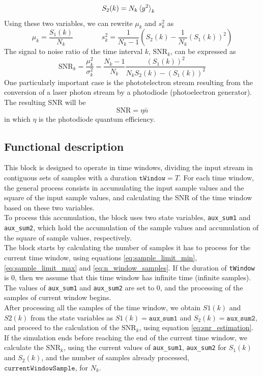 \begin{refsection}
\begin{align}
	S_2(k) &= N_k \braket{y^2}_k
\end{align}
Using these two variables, we can rewrite $\mu_k$ and $s^2_k$ as
\begin{equation}
	\mu_k = \frac{S_1(k)}{N_k}
	\qquad \qquad
	s_k^2 = \frac{1}{N_k-1} \left( S_2(k) - \frac{1}{N_k}(S_1(k))^2 \right)
\end{equation}
The signal to noise ratio of the time interval $k$, $\textrm{SNR}_k$, can be expressed as
\begin{equation}
	\textrm{SNR}_k = \frac{\mu_k^2}{\sigma_k^2} =  \frac{N_k - 1}{N_k}\frac{(S_1(k))^2}{N_k S_2(k) - (S_1(k))^2}
	\label{eq:snr_estimation}
\end{equation}
%
One particularly important case is the phototelectron stream resulting from the conversion of a laser photon stream by a photodiode (photoelectron generator). The resulting SNR will be
\cite{saleh1991}
%
\begin{equation}
	\textrm{SNR} = \eta \bar{n}
	\label{eq:ideal_poisson_snr}
\end{equation}
in which $\eta$ is the photodiode quantum efficiency.
%
\subsection*{Functional description}
%
This block is designed to operate in time windows, dividing the input stream in contiguous sets of samples with a duration $\texttt{tWindow} = T$.
For each time window, the general process consists in accumulating the input sample values and the square of the input sample values, and calculating the SNR of the time window based on these two variables.\\
To process this accumulation, the block uses two state variables, \texttt{aux\_sum1} and \texttt{aux\_sum2}, which hold the accumulation of the sample values and accumulation of the square of sample values, respectively.\\
The block starts by calculating the number of samples it has to process for the current time window, using equations \ref{eq:sample_limit_min}, \ref{eq:sample_limit_max} and \ref{eq:n_window_samples}.
If the duration of \texttt{tWindow} is $0$, then we assume that this time window has infinite time (infinite samples).
The values of \texttt{aux\_sum1} and \texttt{aux\_sum2} are set to $0$, and the processing of the samples of current window begins.\\
After processing all the samples of the time window, we obtain $S1(k)$ and $S2(k)$ from the state variables as $S1(k) = \texttt{aux\_sum1}$ and $S_2(k) = \texttt{aux\_sum2}$, and proceed to the calculation of the $\textrm{SNR}_k$, using equation \ref{eq:snr_estimation}.\\
If the simulation ends before reaching the end of the current time window, we calculate the $\textrm{SNR}_k$, using the current values of \texttt{aux\_sum1}, \texttt{aux\_sum2} for $S_1(k)$ and $S_2(k)$, and the number of samples already processed, $\texttt{currentWindowSample}$, for $N_k$.
%
%
%
%

\end{refsection}
